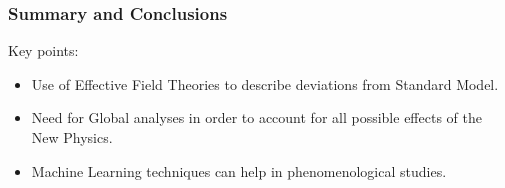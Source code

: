 \documentclass[mathserif, 10pt, dvipsnames]{beamer}
\begin{document}
\begin{frame}\frametitle{Summary and Conclusions}

Key points:

\vspace{0.5cm}

    \begin{itemize}
        \item Use of Effective Field Theories to describe deviations from Standard Model.
        \item Need for Global analyses in order to account for all possible effects of the New Physics.
        \item Machine Learning techniques can help in phenomenological studies.
    \end{itemize}
\end{frame}
\end{document}
